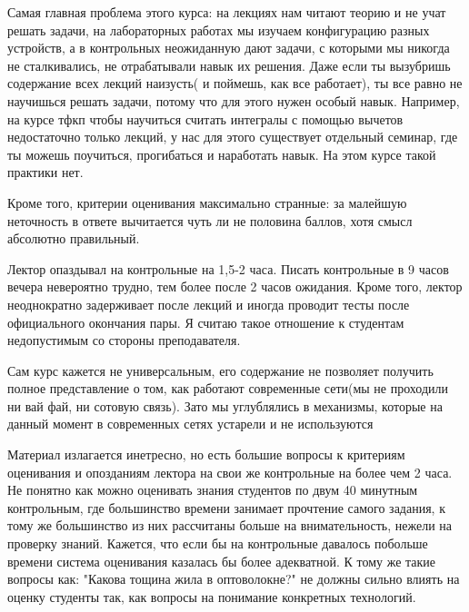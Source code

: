             \begin{commentbox} 
                Самая главная проблема этого курса: на лекциях нам читают теорию и не учат решать задачи, на лабораторных работах мы изучаем конфигурацию разных устройств, а в контрольных неожиданную дают задачи, с которыми мы никогда не сталкивались, не отрабатывали навык их решения. Даже если ты вызубришь содержание всех лекций наизусть( и поймешь, как все работает), ты все равно не научишься решать задачи, потому что для этого нужен особый навык. Например, на курсе тфкп чтобы научиться считать интегралы с помощью вычетов недостаточно только лекций, у нас для этого существует отдельный семинар, где ты можешь поучиться, прогибаться и наработать навык. На этом курсе такой практики нет.
        
                Кроме того, критерии оценивания максимально странные: за малейшую неточность в ответе вычитается чуть ли не половина баллов, хотя смысл абсолютно правильный.
        
                Лектор опаздывал на контрольные на 1,5-2 часа. Писать контрольные в 9 часов вечера невероятно трудно, тем более после 2 часов ожидания. Кроме того, лектор неоднократно задерживает после лекций и иногда проводит тесты после официального окончания пары. Я считаю такое отношение к студентам недопустимым со стороны преподавателя.
        
                Сам курс кажется не универсальным, его содержание не позволяет получить полное представление о том, как работают современные сети(мы не проходили ни вай фай, ни сотовую связь). Зато мы углублялись в механизмы, которые на данный момент в современных сетях устарели и не используются 
            \end{commentbox} 
        
            \begin{commentbox} 
                Материал излагается инетресно, но есть большие вопросы к критериям оценивания и опозданиям лектора на свои же контрольные на более чем 2 часа. Не понятно как можно оценивать знания студентов по двум 40 минутным контрольным, где большинство времени занимает прочтение самого задания, к тому же большинство из них рассчитаны больше на внимательность, нежели на проверку знаний. Кажется, что если бы на контрольные давалось побольше времени система оценивания казалась бы более адекватной. К тому же такие вопросы как: "Какова тощина жила в оптоволокне?" не должны сильно влиять на оценку студенты так, как вопросы на понимание конкретных технологий. 
            \end{commentbox} 
        

